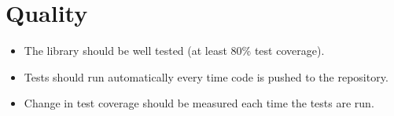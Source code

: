 \section{Quality}

\begin{itemize}
	\item The library should be well tested (at least 80\% test coverage).
	\item Tests should run automatically every time code is pushed to the
		repository.
	\item Change in test coverage should be measured each time the tests are run.
\end{itemize}

